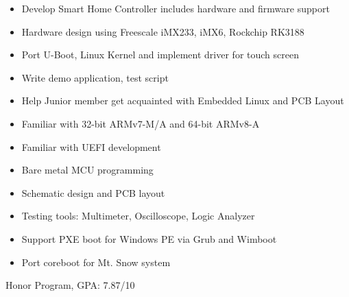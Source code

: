 \documentclass[12pt,a4paper]{altacv}
\begin{document}
\divider

\begin{itemize}
\item Develop Smart Home Controller includes hardware and firmware support
\item Hardware design using Freescale iMX233, iMX6, Rockchip RK3188
\item Port U-Boot, Linux Kernel and implement driver for touch screen
\item Write demo application, test script
\item Help Junior member get acquainted with Embedded Linux and PCB Layout
\end{itemize}


\begin{itemize}
\item Familiar with 32-bit ARMv7-M/A and 64-bit ARMv8-A
\item Familiar with UEFI development
\item Bare metal MCU programming
\item Schematic design and PCB layout
\item Testing tools: Multimeter, Oscilloscope, Logic Analyzer
\end{itemize}

\begin{itemize}
\item Support PXE boot for Windows PE via Grub and Wimboot
\item Port coreboot for Mt. Snow system
\end{itemize}

{
	Honor Program, GPA: 7.87/10
}
\end{document}

